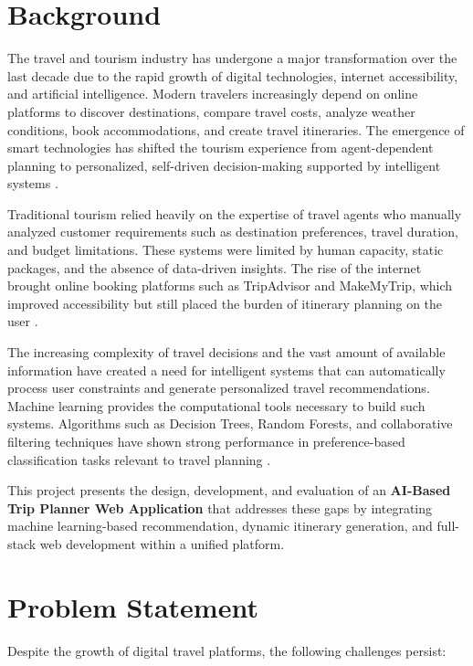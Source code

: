 \section{Background}

The travel and tourism industry has undergone a major transformation over the last decade due to the rapid growth of digital technologies, internet accessibility, and artificial intelligence. Modern travelers increasingly depend on online platforms to discover destinations, compare travel costs, analyze weather conditions, book accommodations, and create travel itineraries. The emergence of smart technologies has shifted the tourism experience from agent-dependent planning to personalized, self-driven decision-making supported by intelligent systems \cite{buhalis2008}.

Traditional tourism relied heavily on the expertise of travel agents who manually analyzed customer requirements such as destination preferences, travel duration, and budget limitations. These systems were limited by human capacity, static packages, and the absence of data-driven insights. The rise of the internet brought online booking platforms such as TripAdvisor and MakeMyTrip, which improved accessibility but still placed the burden of itinerary planning on the user \cite{ricci2015}.

The increasing complexity of travel decisions and the vast amount of available information have created a need for intelligent systems that can automatically process user constraints and generate personalized travel recommendations. Machine learning provides the computational tools necessary to build such systems. Algorithms such as Decision Trees, Random Forests, and collaborative filtering techniques have shown strong performance in preference-based classification tasks relevant to travel planning \cite{pedregosa2011}.

This project presents the design, development, and evaluation of an \textbf{AI-Based Trip Planner Web Application} that addresses these gaps by integrating machine learning-based recommendation, dynamic itinerary generation, and full-stack web development within a unified platform.

\section{Problem Statement}

Despite the growth of digital travel platforms, the following challenges persist:

